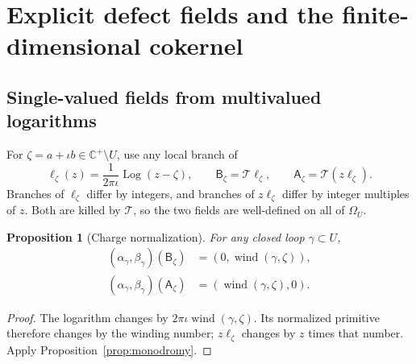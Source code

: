 \documentclass[11pt,a4paper]{article}
\numberwithin{equation}{section}
\newtheorem{proposition}[theorem]{Proposition}
\theoremstyle{definition}
\theoremstyle{remark}
\newcommand{\C}{\mathbb C}
\newcommand{\T}{\mathcal T}
\newcommand{\wind}{\operatorname{wind}}
\newcommand{\Adef}{\mathsf A}
\newcommand{\Bdef}{\mathsf B}
\DeclareMathOperator{\Log}{Log}
\begin{document}
\section{Explicit defect fields and the finite-dimensional cokernel}
\label{sec:range}

\subsection{Single-valued fields from multivalued logarithms}
For $\zeta=a+\iota b\in\C^+\setminus U$, use any local branch of
\begin{equation}
 \ell_\zeta(z)=\frac{1}{2\pi\iota}\Log(z-\zeta),
 \qquad
 \Bdef_\zeta=\T\ell_\zeta,\qquad
 \Adef_\zeta=\T(z\ell_\zeta).
 \label{eq:defects}
\end{equation}
Branches of $\ell_\zeta$ differ by integers, and branches of
$z\ell_\zeta$ differ by integer multiples of $z$. Both are killed by
$\T$, so the two fields are well-defined on all of $\Omega_U$.

\begin{proposition}[Charge normalization]\label{prop:charges}
For any closed loop $\gamma\subset U$,
\begin{align}
 (\alpha_\gamma,\beta_\gamma)(\Bdef_\zeta)
   &=(0,\wind(\gamma,\zeta)),\label{eq:B-charges}\\
 (\alpha_\gamma,\beta_\gamma)(\Adef_\zeta)
   &=(\wind(\gamma,\zeta),0).\label{eq:A-charges}
\end{align}
\end{proposition}
\begin{proof}
The logarithm changes by $2\pi\iota\wind(\gamma,\zeta)$.
Its normalized primitive therefore changes by the winding number;
$z\ell_\zeta$ changes by $z$ times that number.
Apply Proposition~\ref{prop:monodromy}.
\end{proof}
\end{document}
